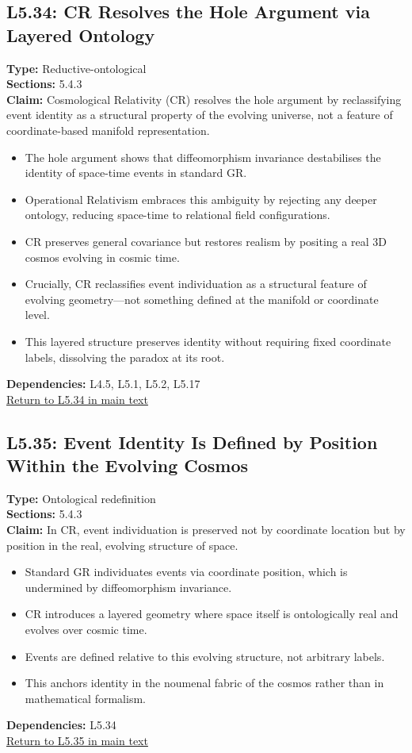 \documentclass[12pt]{book}
\newcommand{\returnlink}[1]{\hyperref[logic:#1]{Return to #1 in main text}\xspace}
\begin{document}
\subsection*{L5.34: CR Resolves the Hole Argument via Layered Ontology}
\label{appendix:L5.34}
\textbf{Type:} Reductive-ontological \\
\textbf{Sections:} 5.4.3 \\
\textbf{Claim:} Cosmological Relativity (CR) resolves the hole argument by reclassifying event identity as a structural property of the evolving universe, not a feature of coordinate-based manifold representation.
\begin{itemize}
  \item The hole argument shows that diffeomorphism invariance destabilises the identity of space-time events in standard GR.
  \item Operational Relativism embraces this ambiguity by rejecting any deeper ontology, reducing space-time to relational field configurations.
  \item CR preserves general covariance but restores realism by positing a real 3D cosmos evolving in cosmic time.
  \item Crucially, CR reclassifies event individuation as a structural feature of evolving geometry---not something defined at the manifold or coordinate level.
  \item This layered structure preserves identity without requiring fixed coordinate labels, dissolving the paradox at its root.
\end{itemize}
\textbf{Dependencies:} L4.5, L5.1, L5.2, L5.17 \\
\returnlink{L5.34}

\subsection*{L5.35: Event Identity Is Defined by Position Within the Evolving Cosmos}
\label{appendix:L5.35}
\textbf{Type:} Ontological redefinition \\
\textbf{Sections:} 5.4.3 \\
\textbf{Claim:} In CR, event individuation is preserved not by coordinate location but by position in the real, evolving structure of space.
\begin{itemize}
  \item Standard GR individuates events via coordinate position, which is undermined by diffeomorphism invariance.
  \item CR introduces a layered geometry where space itself is ontologically real and evolves over cosmic time.
  \item Events are defined relative to this evolving structure, not arbitrary labels.
  \item This anchors identity in the noumenal fabric of the cosmos rather than in mathematical formalism.
\end{itemize}
\textbf{Dependencies:} L5.34 \\
\returnlink{L5.35}
\end{document}
